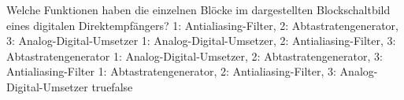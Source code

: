     {Welche Funktionen haben die einzelnen Blöcke im dargestellten Blockschaltbild eines digitalen Direktempfängers?}
    {1: Antialiasing-Filter, 2: Abtastratengenerator, 3: Analog-Digital-Umsetzer}
    {1: Analog-Digital-Umsetzer, 2: Antialiasing-Filter, 3: Abtastratengenerator}
    {1: Analog-Digital-Umsetzer, 2: Abtastratengenerator, 3: Antialiasing-Filter}
    {1: Abtastratengenerator, 2: Antialiasing-Filter, 3: Analog-Digital-Umsetzer}
    {true}{false}